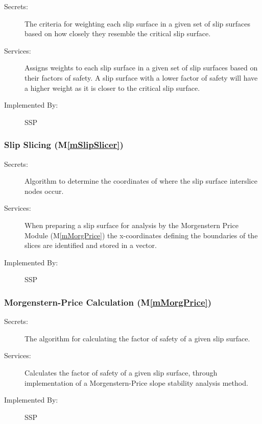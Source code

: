 \documentclass[12pt, titlepage]{article}
\newcommand{\progname}{SSP}
\newcommand{\mref}[1]{M\ref{#1}}
\begin{document}
\begin{description}
\item[Secrets:] The criteria for weighting each slip surface in a given set of 
slip surfaces based on how closely they resemble the critical slip surface.
\item[Services:] Assigns weights to each slip surface in a given set of slip 
surfaces based on their factors of safety. A slip surface with a lower factor 
of safety will have a higher weight as it is closer to the critical slip 
surface.
\item[Implemented By:] \progname
\end{description} 

\subsubsection{Slip Slicing (\mref{mSlipSlicer})}

\begin{description}
	\item[Secrets:] Algorithm to determine the coordinates of where the
	slip surface interslice nodes occur.
	\item[Services:] When preparing a slip surface for analysis by the
	Morgenstern Price Module (\mref{mMorgPrice}) the x-coordinates defining the 
	boundaries of the slices are identified and stored in a vector.
	\item[Implemented By:] \progname
\end{description} 

\subsubsection{Morgenstern-Price Calculation (\mref{mMorgPrice})}

\begin{description}
\item[Secrets:] The algorithm for calculating the factor of safety of a given 
slip surface.
\item[Services:] Calculates the factor of safety of a given slip
  surface, through implementation of a Morgenstern-Price slope
  stability analysis method.
\item[Implemented By:] \progname
\end{description} 
\end{document}
